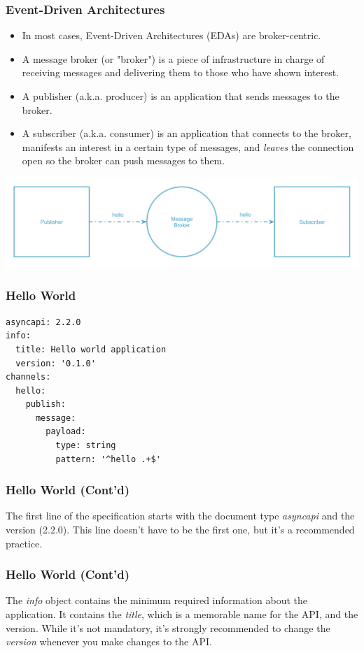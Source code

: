 \documentclass{efd-lecture}
\begin{document}
\begin{frame}
  \frametitle{Event-Driven Architectures}
  \begin{itemize}
    \item In most cases, Event-Driven Architectures (EDAs) are broker-centric.
    \item A message broker (or "broker") is a piece of infrastructure in charge of receiving messages and delivering them to those who have shown interest.
    \item A publisher (a.k.a. producer) is an application that sends messages to the broker.
    \item A subscriber (a.k.a. consumer) is an application that connects to the broker, manifests an interest in a certain type of messages,
      and \textit{\color{YellowOrange}leaves} the connection open so the broker can push messages to them.
  \end{itemize}
  \includegraphics[width=\textwidth]{./img/simple-event-driven.png}
\end{frame}

\begin{frame}[fragile]
  \frametitle{Hello World}
  \begin{verbatim}
asyncapi: 2.2.0
info:
  title: Hello world application
  version: '0.1.0'
channels:
  hello:
    publish:
      message:
        payload:
          type: string
          pattern: '^hello .+$'
  \end{verbatim}
\end{frame}

\begin{frame}[fragile]
  \frametitle{Hello World (Cont'd)}
  \begin{block}{}
    The first line of the specification starts with the document type \textit{\color{YellowOrange} asyncapi} and the version (2.2.0).
    This line doesn't have to be the first one,
    but it's a recommended practice.
  \end{block}
\end{frame}

\begin{frame}[fragile]
  \frametitle{Hello World (Cont'd)}
  \begin{block}{}
    The \textit{\color{YellowOrange} info} object contains the minimum required information about the application.
    It contains the \textit{\color{YellowGreen} title}, which is a memorable name for the API, and the version. While it's not mandatory,
    it's strongly recommended to change the \textit{\color{YellowGreen} version} whenever you make changes to the API\@.
  \end{block}
\end{frame}
\end{document}
